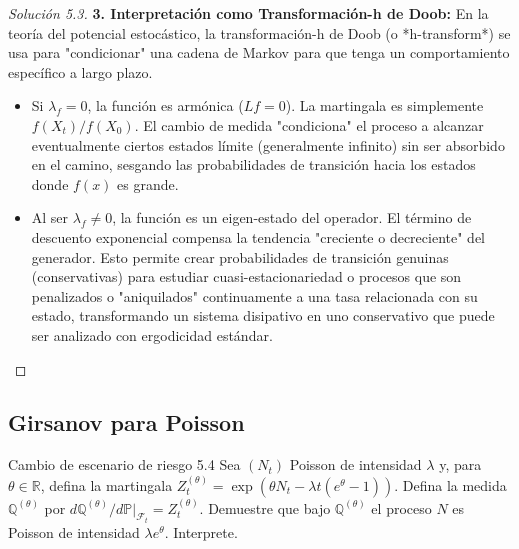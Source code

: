 \documentclass[10pt,a4paper]{article}
\begin{document}
\begin{proof}[Solución  5.3]
    \textbf{3. Interpretación como Transformación-h de Doob:}
    En la teoría del potencial estocástico, la transformación-h de Doob (o *h-transform*) se usa para "condicionar" una cadena de Markov para que tenga un comportamiento específico a largo plazo.
    \begin{itemize}
        \item Si $\lambda_f = 0$, la función es armónica ($Lf=0$). La martingala es simplemente $f(X_t)/f(X_0)$. El cambio de medida "condiciona" el proceso a alcanzar eventualmente ciertos estados límite (generalmente infinito) sin ser absorbido en el camino, sesgando las probabilidades de transición hacia los estados donde $f(x)$ es grande.
        \item Al ser $\lambda_f \neq 0$, la función es un eigen-estado del operador. El término de descuento exponencial compensa la tendencia "creciente o decreciente" del generador. Esto permite crear probabilidades de transición genuinas (conservativas) para estudiar cuasi-estacionariedad o procesos que son penalizados o "aniquilados" continuamente a una tasa relacionada con su estado, transformando un sistema disipativo en uno conservativo que puede ser analizado con ergodicidad estándar.
    \end{itemize}
\end{proof}

\newpage
\subsection{Girsanov para Poisson}

\begin{ejercicio}{Cambio de escenario de riesgo }{5.4}
    Sea $(N_t)$ Poisson de intensidad $\lambda$ y, para $\theta \in \mathbb{R}$, defina la martingala $Z_t^{(\theta)} = \exp(\theta N_t - \lambda t(e^\theta - 1))$. Defina la medida $\mathbb{Q}^{(\theta)}$ por $d\mathbb{Q}^{(\theta)} / d\mathbb{P}|_{\mathcal{F}_t} = Z_t^{(\theta)}$. Demuestre que bajo $\mathbb{Q}^{(\theta)}$ el proceso $N$ es Poisson de intensidad $\lambda e^\theta$. Interprete.
\end{ejercicio}
\end{document}
